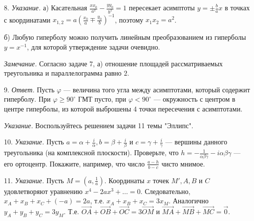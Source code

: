 8. \textit{Указание.} а) Касательная $\frac{xx_0}{a^2} - \frac{yy_0}{b^2} = 1$ пересекает асимптоты $y = \pm \frac{b}{a}x$ в точках с координатами $x_{1,2} = a\left(\frac{x_0}{a} \mp \frac{y_0}{b}\right)^{-1}$, поэтому $x_1 x_2 = a^2$. 

б) Любую гиперболу можно получить линейным преобразованием из гиперболы $y = x^{-1}$, для которой утверждение задачи очевидно. 

\textit{Замечание.} Согласно задаче 7, а) отношение площадей рассматриваемых треугольника и параллелограмма равно $2$.

9. \textit{Ответ.} Пусть $\varphi$ — величина того угла между асимптотами, который содержит гиперболу. При $\varphi \ge 90^\circ$ ГМТ пусто, при $\varphi < 90^\circ$ — окружность с центром в центре гиперболы, из которой выброшены 4 точки пересечения с асимптотами. 

\textit{Указание.} Воспользуйтесь решением задачи 11 темы "Эллипс".

10. \textit{Указание.} Пусть $a = \alpha + \frac{i}{\alpha}, b = \beta + \frac{i}{\beta}$ и $c = \gamma + \frac{i}{\gamma}$ — вершины данного треугольника (на комплексной плоскости). Проверьте, что $h = - \frac{1}{\alpha \beta \gamma} - i \alpha \beta \gamma$ — его ортоцентр. Покажите, например, что число $\frac{a - h}{b - c}$ чисто мнимое.

11. \textit{Указание.} Пусть $M = (a, \frac{1}{a})$. Координаты $x$ точек $M', A, B$ и $C$ удовлетворяют уравнению $x^4 - 2ax^3 + \dots = 0$. Следовательно, $x_A + x_B + x_C +(-a) = 2a$, т.е. $x_A + x_B + x_C = 3x_M$. Аналогично $y_A + y_B + y_C = 3y_M$. Т.е. $\vec{OA} + \vec{OB} + \vec{OC} = 3\vec{OM}$ и $\vec{MA} + \vec{MB} + \vec{MC} = \vec{0}$.

% 
